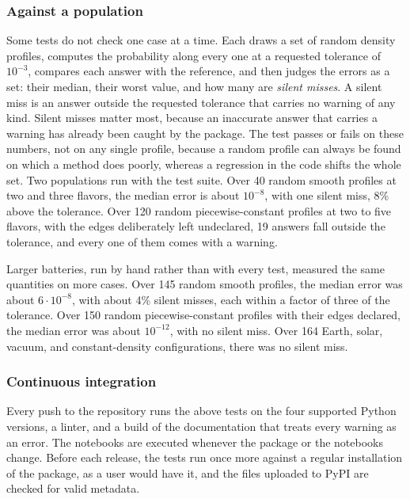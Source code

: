 \documentclass[final,5p,times,twocolumn,sort,compress]{elsarticle}
\makeatletter
\DeclareRobustCommand{\_}{%
  \ifmmode\nfss@text{\textunderscore}\else\textunderscore\allowbreak\fi}
\makeatother
\begin{document}
\subsubsection{Against a population}

Some tests do not check one case at a time. Each draws a set of random density profiles, computes the probability along every one at a requested tolerance of $10^{-3}$, compares each answer with the reference, and then judges the errors as a set: their median, their worst value, and how many are \emph{silent misses}. A silent miss is an answer outside the requested tolerance that carries no warning of any kind. Silent misses matter most, because an inaccurate answer that carries a warning has already been caught by the package. The test passes or fails on these numbers, not on any single profile, because a random profile can always be found on which a method does poorly, whereas a regression in the code shifts the whole set. Two populations run with the test suite. Over 40 random smooth profiles at two and three flavors, the median error is about $10^{-8}$, with one silent miss, 8\% above the tolerance. Over 120 random piecewise-constant profiles at two to five flavors, with the edges deliberately left undeclared, 19 answers fall outside the tolerance, and every one of them comes with a warning.

Larger batteries, run by hand rather than with every test, measured the same quantities on more cases. Over 145 random smooth profiles, the median error was about $6 \cdot 10^{-8}$, with about 4\% silent misses, each within a factor of three of the tolerance. Over 150 random piecewise-constant profiles with their edges declared, the median error was about $10^{-12}$, with no silent miss. Over 164 Earth, solar, vacuum, and constant-density configurations, there was no silent miss.

\subsubsection{Continuous integration}

Every push to the repository runs the above tests on the four supported Python versions, a linter, and a build of the documentation that treats every warning as an error. The notebooks are executed whenever the package or the notebooks change. Before each release, the tests run once more against a regular installation of the package, as a user would have it, and the files uploaded to PyPI are checked for valid metadata.
\end{document}
